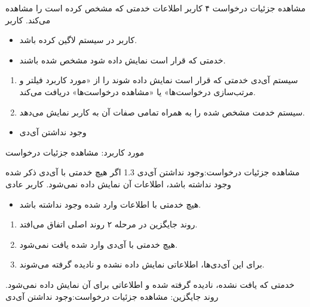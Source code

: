 {
	\usecase
	{مشاهده جزئیات درخواست}
	{۴}
	{کاربر اطلاعات خدمتی که مشخص کرده است را مشاهده می‌کند.}
	{کاربر}
	{}
	{
		\begin{itemize}
			\item
			کاربر در سیستم لاگین کرده باشد.
			
			\item
			‌خدمتی که قرار است نمایش داده شود مشخص شده باشند.
		\end{itemize}
	}
	{
		\begin{enumerate}
			\item 
			سیستم آی‌دی خدمتی که قرار است نمایش داده شوند را از «مورد کاربرد  فیلتر و مرتب‌سازی درخواست‌ها»  یا «مشاهده درخواست‌ها» دریافت می‌کند.
			
			\item
			سیستم خدمت مشخص شده را به همراه تمامی صفات آن به کاربر نمایش می‌دهد.
		\end{enumerate}
	}
	{
	}
	{
		\begin{itemize}
			\item 
			وجود نداشتن آی‌دی‌
		\end{itemize}
	}
	{مورد کاربرد: مشاهده جزئیات درخواست}
	
	\alternativeflow
	{
		مشاهده جزئیات درخواست:وجود‌ نداشتن آی‌دی‌
	}
	{1.3}
	{
		اگر هیچ خدمتی با آی‌دی‌ ذکر شده وجود نداشته باشد، اطلاعات آن نمایش داده نمی‌شود.
	}
	{
		کاربر عادی
	}
	{}
	{
		\begin{itemize}
			
			\item
			هیچ خدمتی با اطلاعات وارد شده وجود نداشته باشد.
		\end{itemize}
	}
	{
		\vspace*{-0.6cm}
		\begin{enumerate}
			\item 
			روند جایگزین در مرحله ۲ روند اصلی اتفاق می‌افتد.
			\item
			هیچ خدمتی با آی‌دی‌ وارد شده یافت نمی‌شود.
			\item 
			برای این آی‌دی‌ها، اطلاعاتی نمایش داده نشده و نادیده گرفته می‌شوند.
		\end{enumerate}
	}
	{
		خدمتی که یافت نشده‌، نادیده گرفته شده و اطلاعاتی برای آن نمایش داده نمی‌شود.
	}
	{
		روند جایگزین: مشاهده جزئیات درخواست:وجود‌ نداشتن آی‌دی‌
	}
}



